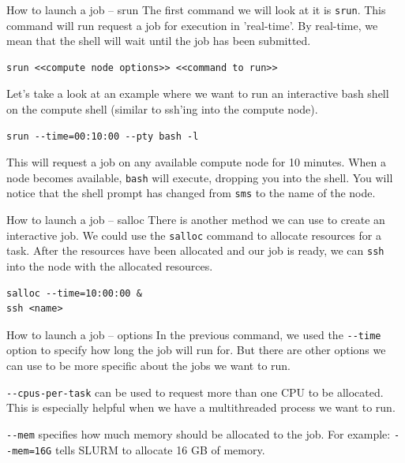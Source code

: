 \documentclass[10pt]{beamer}
\begin{document}
\begin{frame}[label={sec:orgbf69753},fragile]{How to launch a job -- srun}
 The first command we will look at it is \texttt{srun}. This command will run request a
job for execution in 'real-time'. By real-time, we mean that the shell will wait
until the job has been submitted.

\begin{verbatim}
srun <<compute node options>> <<command to run>>
\end{verbatim}

Let's take a look at an example where we want to run an interactive bash shell
on the compute shell (similar to ssh'ing into the compute node).

\begin{verbatim}
srun --time=00:10:00 --pty bash -l
\end{verbatim}

This will request a job on any available compute node for 10 minutes. When a
node becomes available, \texttt{bash} will execute, dropping you into the shell. You will
notice that the shell prompt has changed from \texttt{sms} to the name of the node.
\end{frame}

\begin{frame}[label={sec:orgb7b695b},fragile]{How to launch a job -- salloc}
 There is another method we can use to create an interactive job. We could use the
\texttt{salloc} command to allocate resources for a task. After the resources have been
allocated and our job is ready, we can \texttt{ssh} into the node with the allocated
resources.

\begin{verbatim}
salloc --time=10:00:00 &
ssh <name>
\end{verbatim}
\end{frame}

\begin{frame}[label={sec:org1915bc4},fragile]{How to launch a job -- options}
 In the previous command, we used the \texttt{-{}-time} option to specify how long the job
will run for. But there are other options we can use to be more specific about
the jobs we want to run.

\texttt{-{}-cpus-per-task} can be used to request more than one CPU to be
allocated. This is especially helpful when we have a multithreaded process we
want to run.

\texttt{-{}-mem} specifies how much memory should be allocated to the job. For example:
\texttt{-{}-mem=16G} tells SLURM to allocate 16 GB of memory.
\end{frame}
\end{document}
